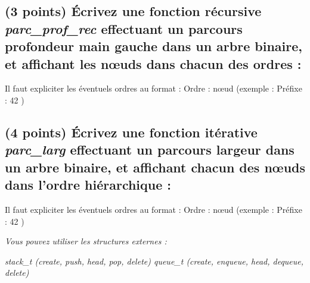 \documentclass[11pt,a4paper]{article}
\begin{document}

\subsection{(3 points) \'Ecrivez une fonction récursive \og \textit{parc\_prof\_rec} \fg{} effectuant un parcours profondeur main gauche dans un arbre binaire, et affichant les nœuds dans chacun des ordres : }

\noindent Il faut expliciter les éventuels ordres au format : \og Ordre : nœud \fg{} (exemple : \og Préfixe : 42 \fg{})

\begin{center}
\end{center}



\clearpage


\subsection{(4 points) \'Ecrivez une fonction itérative \og \textit{parc\_larg} \fg{} effectuant un parcours largeur dans un arbre binaire, et affichant chacun des nœuds dans l'ordre hiérarchique : }

\noindent Il faut expliciter les éventuels ordres au format : \og Ordre : nœud \fg{} (exemple : \og Préfixe : 42 \fg{})

\medskip

\noindent \textit{Vous pouvez utiliser les structures externes :}

\noindent \textit{stack\_t (create, push, head, pop, delete) \hfill queue\_t (create, enqueue, head, dequeue, delete) }

\begin{center}
\end{center}


\clearpage



\end{document}
